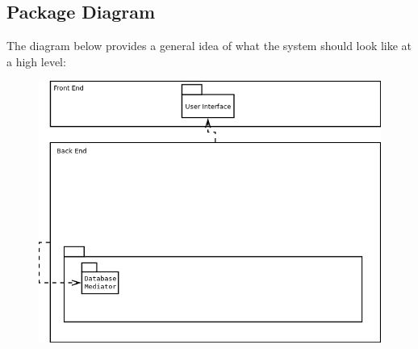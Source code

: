 \subsection{Package Diagram} \label{sec:Requirements.PackageDiagram}
The diagram below provides a general idea of what the system should look like at a high level:
\begin{figure}[ht!]
  \begin{center}
    \includegraphics[width=14cm]{./contents/img/Package_Diagram.png}
  \end{center}
\end{figure}
\FloatBarrier
